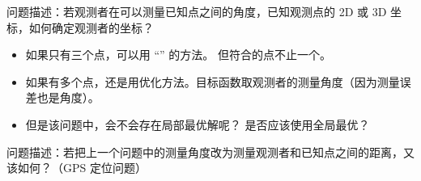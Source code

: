 
\begin{issues}
\issueDraft
\end{issues}

问题描述：若观测者在可以测量已知点之间的角度，已知观测点的 2D 或 3D 坐标，如何确定观测者的坐标？

\begin{itemize}
\item 如果只有三个点，可以用 “” 的方法。 但符合的点不止一个。
\item 如果有多个点，还是用优化方法。目标函数取观测者的测量角度（因为测量误差也是角度）。
\item 但是该问题中，会不会存在局部最优解呢？ 是否应该使用全局最优？
\end{itemize}

问题描述：若把上一个问题中的测量角度改为测量观测者和已知点之间的距离，又该如何？（GPS 定位问题）
